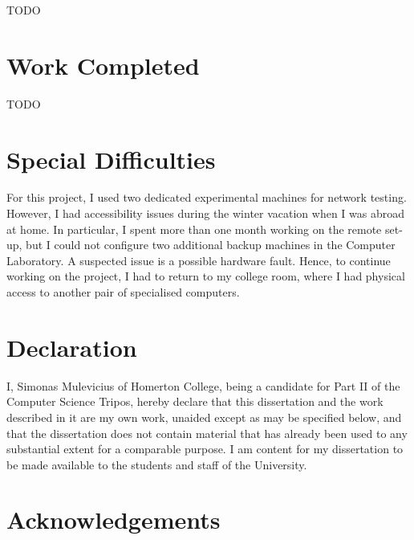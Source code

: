 \documentclass[12pt,a4paper,twoside,openright]{report}
\begin{document}
TODO

\section*{Work Completed}

TODO

\section*{Special Difficulties}

For this project, I used two dedicated experimental machines for network testing. 
However, I had accessibility issues during the winter vacation when I was abroad at home.
In particular, I spent more than one month working on the remote set-up, but I could not configure two additional backup machines in the Computer Laboratory.
A suspected issue is a possible hardware fault.
Hence, to continue working on the project, I had to return to my college room, where I had physical access to another pair of specialised computers.
 
\newpage
\section*{Declaration}

I, Simonas Mulevicius of Homerton College, being a candidate for Part II of the Computer
Science Tripos, hereby declare
that this dissertation and the work described in it are my own work,
unaided except as may be specified below, and that the dissertation
does not contain material that has already been used to any substantial
extent for a comparable purpose. I am content for my dissertation to
be made available to the students and staff of the University.

\bigskip
{}

\medskip
{}






\tableofcontents

\listoffigures

\newpage
\section*{Acknowledgements}
\end{document}
